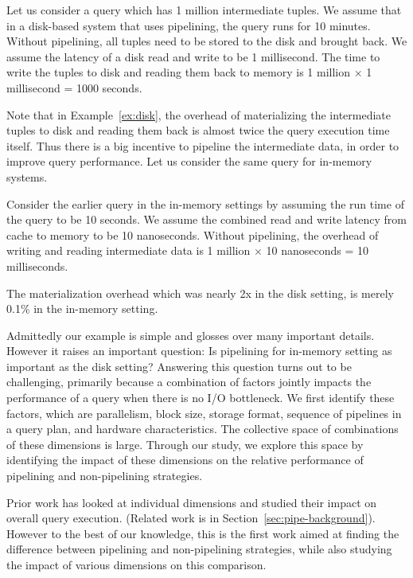 \begin{example}\label{ex:disk}
Let us consider a query which has 1 million intermediate tuples.
We assume that in a disk-based system that uses pipelining, the query runs for 10 minutes. 
Without pipelining, all tuples need to be stored to the disk and brought back.
We assume the latency of a disk read and write to be 1 millisecond.
The time to write the tuples to disk and reading them back to memory is 1 million $\times$ 1 millisecond = 1000 seconds.
\end{example}

Note that in Example~\ref{ex:disk}, the overhead of materializing the intermediate tuples to disk and reading them back is almost twice the query execution time itself. 
Thus there is a big incentive to pipeline the intermediate data, in order to improve query performance. 
Let us consider the same query for in-memory systems.

\begin{example}\label{ex:in-mem}
Consider the earlier query in the in-memory settings by assuming the run time of the query to be 10 seconds. 
We assume the combined read and write latency from cache to memory to be 10 nanoseconds.
Without pipelining, the overhead of writing and reading intermediate data is 1 million $\times$ 10 nanoseconds = 10 milliseconds.
\end{example}

The materialization overhead which was nearly 2x in the disk setting, is merely 0.1\% in the in-memory setting.

Admittedly our example is simple and glosses over many important details. 
However it raises an important question: Is pipelining for in-memory setting as important as the disk setting? 
Answering this question turns out to be challenging, primarily because a combination of factors jointly impacts the performance of a query when there is no I/O bottleneck. 
We first identify these factors, which are parallelism, block size, storage format, sequence of pipelines in a query plan, and hardware characteristics.
The collective space of combinations of these dimensions is large. 
Through our study, we explore this space by identifying the impact of these dimensions on the relative performance of pipelining and non-pipelining strategies.

Prior work has looked at individual dimensions and studied their impact on overall query execution. (Related work is in Section~\ref{sec:pipe-background}).
However to the best of our knowledge, this is the first work aimed at finding the difference between pipelining and non-pipelining strategies, while also studying the impact of various dimensions on this comparison. 
%

